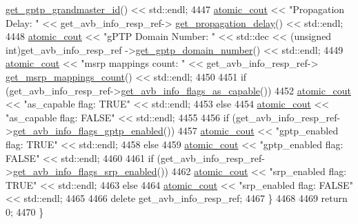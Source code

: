 \begin{DoxyCode}
      \hyperlink{classavdecc__lib_1_1avb__interface__get__avb__info__response_a9a1f74c17f1a794b244945556713f6cd}{get\_gptp\_grandmaster\_id}() << std::endl;
4447         \hyperlink{cmd__line_8h_a0bc38ccc65c79ba06c6fcd7b4bf554c3}{atomic\_cout} << \textcolor{stringliteral}{"Propagation Delay: "} << get\_avb\_info\_resp\_ref->
      \hyperlink{classavdecc__lib_1_1avb__interface__get__avb__info__response_a188c53e804e82e99ff100d0af99f70f7}{get\_propagation\_delay}() << std::endl;
4448         \hyperlink{cmd__line_8h_a0bc38ccc65c79ba06c6fcd7b4bf554c3}{atomic\_cout} << \textcolor{stringliteral}{"gPTP Domain Number: "} << std::dec << (\textcolor{keywordtype}{unsigned} int)get\_avb\_info\_resp\_ref
      ->\hyperlink{classavdecc__lib_1_1avb__interface__get__avb__info__response_ae95507507837659c46bbfa2732a243f9}{get\_gptp\_domain\_number}() << std::endl;
4449         \hyperlink{cmd__line_8h_a0bc38ccc65c79ba06c6fcd7b4bf554c3}{atomic\_cout} << \textcolor{stringliteral}{"msrp mappings count: "} << get\_avb\_info\_resp\_ref->
      \hyperlink{classavdecc__lib_1_1avb__interface__get__avb__info__response_a63ffcdd29388ba0652e958de4eec227b}{get\_msrp\_mappings\_count}() << std::endl;
4450 
4451         \textcolor{keywordflow}{if} (get\_avb\_info\_resp\_ref->\hyperlink{classavdecc__lib_1_1avb__interface__get__avb__info__response_a389fb2228a18f440d84761b5a5104f9e}{get\_avb\_info\_flags\_as\_capable}())
4452             \hyperlink{cmd__line_8h_a0bc38ccc65c79ba06c6fcd7b4bf554c3}{atomic\_cout} << \textcolor{stringliteral}{"as\_capable flag: TRUE"} << std::endl;
4453         \textcolor{keywordflow}{else}
4454             \hyperlink{cmd__line_8h_a0bc38ccc65c79ba06c6fcd7b4bf554c3}{atomic\_cout} << \textcolor{stringliteral}{"as\_capable flag: FALSE"} << std::endl;
4455 
4456         \textcolor{keywordflow}{if} (get\_avb\_info\_resp\_ref->\hyperlink{classavdecc__lib_1_1avb__interface__get__avb__info__response_a854fa1df8f258747954198e425db94e6}{get\_avb\_info\_flags\_gptp\_enabled}())
4457             \hyperlink{cmd__line_8h_a0bc38ccc65c79ba06c6fcd7b4bf554c3}{atomic\_cout} << \textcolor{stringliteral}{"gptp\_enabled flag: TRUE"} << std::endl;
4458         \textcolor{keywordflow}{else}
4459             \hyperlink{cmd__line_8h_a0bc38ccc65c79ba06c6fcd7b4bf554c3}{atomic\_cout} << \textcolor{stringliteral}{"gptp\_enabled flag: FALSE"} << std::endl;
4460 
4461         \textcolor{keywordflow}{if} (get\_avb\_info\_resp\_ref->\hyperlink{classavdecc__lib_1_1avb__interface__get__avb__info__response_afb7a3377753771909265e2c78037afaa}{get\_avb\_info\_flags\_srp\_enabled}())
4462             \hyperlink{cmd__line_8h_a0bc38ccc65c79ba06c6fcd7b4bf554c3}{atomic\_cout} << \textcolor{stringliteral}{"srp\_enabled flag: TRUE"} << std::endl;
4463         \textcolor{keywordflow}{else}
4464             \hyperlink{cmd__line_8h_a0bc38ccc65c79ba06c6fcd7b4bf554c3}{atomic\_cout} << \textcolor{stringliteral}{"srp\_enabled flag: FALSE"} << std::endl;
4465 
4466         \textcolor{keyword}{delete} get\_avb\_info\_resp\_ref;
4467     \}
4468 
4469     \textcolor{keywordflow}{return} 0;
4470 \}
\end{DoxyCode}


